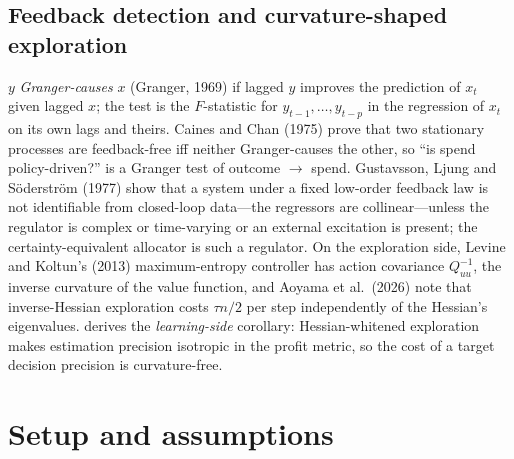 \subsection{Feedback detection and curvature-shaped exploration}

$y$ \emph{Granger-causes} $x$ (Granger, 1969) if lagged $y$ improves the prediction of $x_t$ given lagged $x$; the test is the $F$-statistic for $y_{t-1}, \ldots, y_{t-p}$ in the regression of $x_t$ on its own lags and theirs. Caines and Chan (1975) prove that two stationary processes are feedback-free iff neither Granger-causes the other, so ``is spend policy-driven?'' is a Granger test of outcome $\to$ spend. Gustavsson, Ljung and S\"oderstr\"om (1977) show that a system under a fixed low-order feedback law is not identifiable from closed-loop data---the regressors are collinear---unless the regulator is complex or time-varying or an external excitation is present; the certainty-equivalent allocator is such a regulator. On the exploration side, Levine and Koltun's (2013) maximum-entropy controller has action covariance $Q_{uu}^{-1}$, the inverse curvature of the value function, and Aoyama et al.\ (2026) note that inverse-Hessian exploration costs $\tau n/2$ per step independently of the Hessian's eigenvalues.  derives the \emph{learning-side} corollary: Hessian-whitened exploration makes estimation precision isotropic in the profit metric, so the cost of a target decision precision is curvature-free.

\section{Setup and assumptions}

